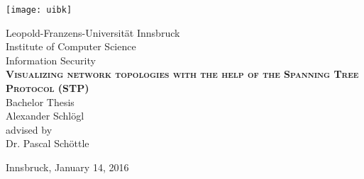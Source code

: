 \begin{titlepage}

    \begin{center}

        \texttt{[image: uibk]}

        \large Leopold-Franzens-Universit\"at Innsbruck\\
        [0.5cm]  

        \large Institute of Computer Science\\Information Security\\
        [3cm]

        \textsc{\large\textbf{Visualizing network topologies with the help of the Spanning Tree Protocol (STP)}}\\
        Bachelor Thesis\\
        [2cm]

        Alexander Schlögl\\
        [3.5cm]

        advised by\\
        Dr. Pascal Schöttle\\

        \vfill

        Innsbruck, January 14, 2016

    \end{center}

\end{titlepage}


